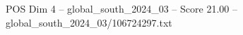 \begin{textsample}{POS Dim 4 – global\_south\_2024\_03 – Score 21.00 – global\_south\_2024\_03/106724297.txt}
\end{textsample}
